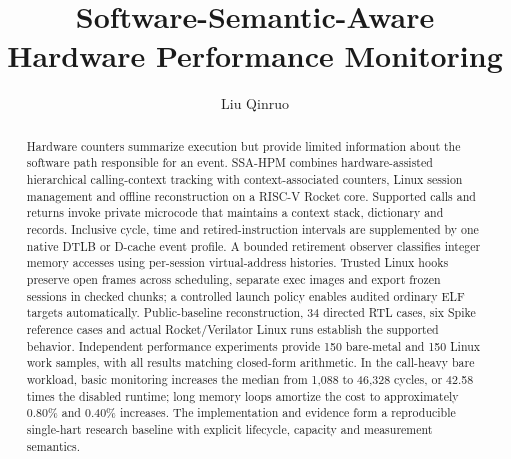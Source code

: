 \documentclass[11pt]{article}
\title{Software-Semantic-Aware Hardware Performance Monitoring}
\author{Liu Qinruo}
\begin{document}
\maketitle
\begin{abstract}
Hardware counters summarize execution but provide limited information about the software path responsible for an event. SSA-HPM combines hardware-assisted hierarchical calling-context tracking with context-associated counters, Linux session management and offline reconstruction on a RISC-V Rocket core. Supported calls and returns invoke private microcode that maintains a context stack, dictionary and records. Inclusive cycle, time and retired-instruction intervals are supplemented by one native DTLB or D-cache event profile. A bounded retirement observer classifies integer memory accesses using per-session virtual-address histories. Trusted Linux hooks preserve open frames across scheduling, separate exec images and export frozen sessions in checked chunks; a controlled launch policy enables audited ordinary ELF targets automatically. Public-baseline reconstruction, 34 directed RTL cases, six Spike reference cases and actual Rocket/Verilator Linux runs establish the supported behavior. Independent performance experiments provide 150 bare-metal and 150 Linux work samples, with all results matching closed-form arithmetic. In the call-heavy bare workload, basic monitoring increases the median from 1,088 to 46,328 cycles, or 42.58 times the disabled runtime; long memory loops amortize the cost to approximately 0.80\% and 0.40\% increases. The implementation and evidence form a reproducible single-hart research baseline with explicit lifecycle, capacity and measurement semantics.
\end{abstract}












\end{document}

